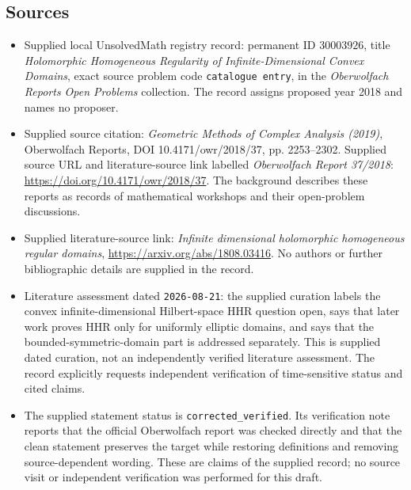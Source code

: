 \documentclass[11pt]{article}
\begin{document}
\subsection{Sources}
\begin{itemize}
\item Supplied local UnsolvedMath registry record: permanent ID \(30003926\), title \emph{Holomorphic Homogeneous Regularity of Infinite-Dimensional Convex Domains}, exact source problem code \texttt{catalogue entry}, in the \emph{Oberwolfach Reports Open Problems} collection. The record assigns proposed year 2018 and names no proposer.
\item Supplied source citation: \emph{Geometric Methods of Complex Analysis (2019)}, Oberwolfach Reports, DOI 10.4171/owr/2018/37, pp. 2253--2302. Supplied source URL and literature-source link labelled \emph{Oberwolfach Report 37/2018}: \url{https://doi.org/10.4171/owr/2018/37}. The background describes these reports as records of mathematical workshops and their open-problem discussions.
\item Supplied literature-source link: \emph{Infinite dimensional holomorphic homogeneous regular domains}, \url{https://arxiv.org/abs/1808.03416}. No authors or further bibliographic details are supplied in the record.
\item Literature assessment dated \texttt{2026-08-21}: the supplied curation labels the convex infinite-dimensional Hilbert-space HHR question open, says that later work proves HHR only for uniformly elliptic domains, and says that the bounded-symmetric-domain part is addressed separately. This is supplied dated curation, not an independently verified literature assessment. The record explicitly requests independent verification of time-sensitive status and cited claims.
\item The supplied statement status is \texttt{corrected\_verified}. Its verification note reports that the official Oberwolfach report was checked directly and that the clean statement preserves the target while restoring definitions and removing source-dependent wording. These are claims of the supplied record; no source visit or independent verification was performed for this draft.
\end{itemize}
\end{document}

